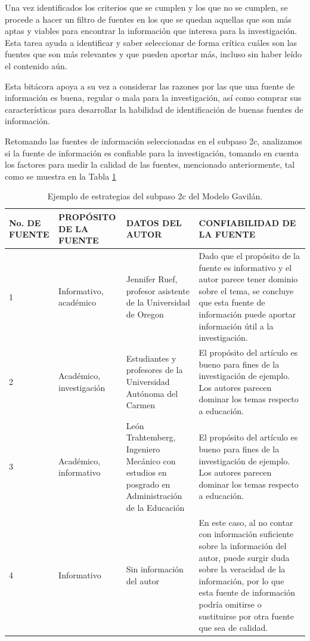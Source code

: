 Una vez identificados los criterios que se cumplen y los que no se cumplen, se procede a hacer un filtro de fuentes en los que se quedan aquellas que son más aptas y viables para encontrar la información que interesa para la investigación. Esta tarea ayuda a identificar y saber seleccionar de forma crítica cuáles son las fuentes que son más relevantes y que pueden aportar más, incluso sin haber leído el contenido aún.

Esta bitácora apoya a su vez a considerar las razones por las que una fuente de información es buena, regular o mala para la investigación, así como comprar sus características para desarrollar la habilidad de identificación de buenas fuentes de información.

Retomando las fuentes de información seleccionadas en el subpaso 2c, analizamos si la fuente de información es confiable para la investigación, tomando en cuenta los factores para medir la calidad de las fuentes, mencionado anteriormente, tal como se muestra en la Tabla \ref{tab:t4}

\begin{table}[H]
  \begin{center}
    \begin{tabular}{ | p{2cm} | p{4cm} | p{4cm} | p{6cm} | }
      \hline
      No. DE FUENTE & PROPÓSITO DE LA FUENTE & DATOS DEL AUTOR & CONFIABILIDAD DE LA FUENTE \\ \hline
      1 & Informativo, académico & Jennifer Ruef, profesor asistente de la Universidad de Oregon & Dado que el propósito de la fuente es informativo y el autor parece tener dominio sobre el tema, se concluye que esta fuente de información puede aportar información útil a la investigación. \\ \hline
      2 & Académico, investigación & Estudiantes y profesores de la Universidad Autónoma del Carmen & El propósito del artículo es bueno para fines de la investigación de ejemplo. Los autores parecen dominar los temas respecto a educación. \\ \hline
      3 & Académico, informativo & León Trahtemberg, Ingeniero Mecánico  con estudios en posgrado en Administración de la Educación & El propósito del artículo es bueno para fines de la investigación de ejemplo. Los autores parecen dominar los temas respecto a educación. \\ \hline
      4 & Informativo & Sin información del autor & En este caso, al no contar con información suficiente sobre la información del autor, puede surgir duda sobre la veracidad de la información, por lo que esta fuente de información podría omitirse o sustituirse por otra fuente que sea de calidad. \\ \hline

    \end{tabular}
    \caption{Ejemplo de estrategias del subpaso 2c del Modelo Gavilán.}
    \label{tab:t4}
  \end{center}
\end{table}

